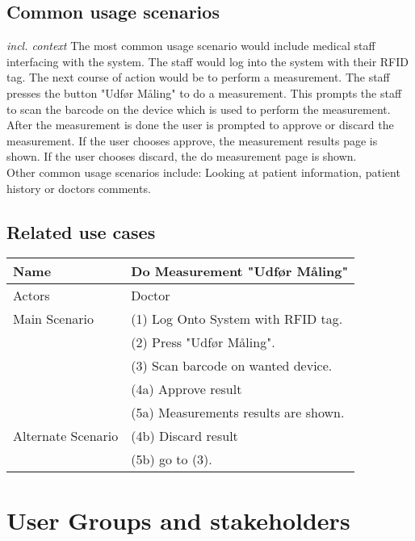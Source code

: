 \subsection{Common usage scenarios}
\textit{incl. context}
The most common usage scenario would include medical staff interfacing with the system. The staff would log into the system with their RFID tag. The next course of action would be to perform a measurement. The staff presses the button "Udfør Måling" to do a measurement. This prompts the staff to scan the barcode on the  device which is used to perform the measurement. After the measurement is done the user is prompted to approve or discard the measurement. If the user chooses approve, the measurement results page is shown. If the user chooses discard, the do measurement page is shown.\\
Other common usage scenarios include: Looking at patient information, patient history or doctors comments.

\subsection{Related use cases}

\begin{table}[H]
    \begin{tabular}{|p{4cm}|p{8cm}|}
    \hline
    Name          & Do Measurement "Udfør Måling"   \\\hline
    Actors        & Doctor \\\hline
    Main Scenario & (1) Log Onto System with RFID tag. \\
    ~             & (2) Press "Udfør Måling". \\
    ~             & (3) Scan barcode on wanted device. \\
    ~             & (4a) Approve result \\         
    ~             & (5a) Measurements results are shown.\\\hline
    
    Alternate Scenario & (4b) Discard result \\
        ~             & (5b) go to (3).\\\hline
    \end{tabular}
\end{table}



\section{User Groups and stakeholders}
